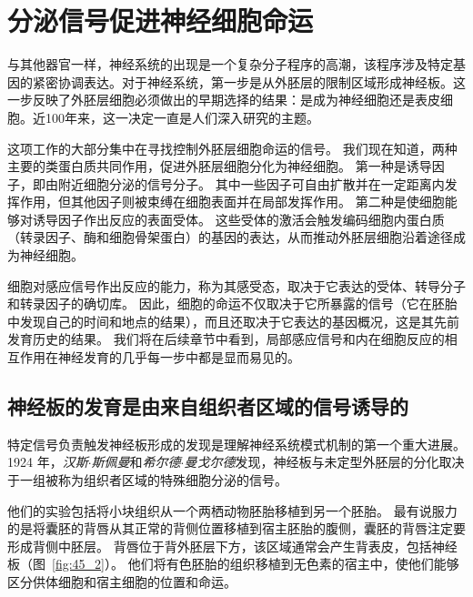 \section{分泌信号促进神经细胞命运}

与其他器官一样，神经系统的出现是一个复杂分子程序的高潮，该程序涉及特定基因的紧密协调表达。对于神经系统，第一步是从外胚层的限制区域形成神经板。这一步反映了外胚层细胞必须做出的早期选择的结果：是成为神经细胞还是表皮细胞。近100年来，这一决定一直是人们深入研究的主题。


这项工作的大部分集中在寻找控制外胚层细胞命运的信号。
我们现在知道，两种主要的类蛋白质共同作用，促进外胚层细胞分化为神经细胞。
第一种是诱导因子，即由附近细胞分泌的信号分子。
其中一些因子可自由扩散并在一定距离内发挥作用，但其他因子则被束缚在细胞表面并在局部发挥作用。
第二种是使细胞能够对诱导因子作出反应的表面受体。
这些受体的激活会触发编码细胞内蛋白质（转录因子、酶和细胞骨架蛋白）的基因的表达，从而推动外胚层细胞沿着途径成为神经细胞。


细胞对感应信号作出反应的能力，称为其感受态，取决于它表达的受体、转导分子和转录因子的确切库。
因此，细胞的命运不仅取决于它所暴露的信号（它在胚胎中发现自己的时间和地点的结果），而且还取决于它表达的基因概况，这是其先前发育历史的结果。
我们将在后续章节中看到，局部感应信号和内在细胞反应的相互作用在神经发育的几乎每一步中都是显而易见的。



\subsection{神经板的发育是由来自组织者区域的信号诱导的}

特定信号负责触发神经板形成的发现是理解神经系统模式机制的第一个重大进展。
1924 年，\textit{汉斯$\cdot$斯佩曼}和\textit{希尔德$\cdot$曼戈尔德}发现，神经板与未定型外胚层的分化取决于一组被称为组织者区域的特殊细胞分泌的信号。


他们的实验包括将小块组织从一个两栖动物胚胎移植到另一个胚胎。
最有说服力的是将囊胚的背唇从其正常的背侧位置移植到宿主胚胎的腹侧，囊胚的背唇注定要形成背侧中胚层。
背唇位于背外胚层下方，该区域通常会产生背表皮，包括神经板（图~\ref{fig:45_2}）。
他们将有色胚胎的组织移植到无色素的宿主中，使他们能够区分供体细胞和宿主细胞的位置和命运。


